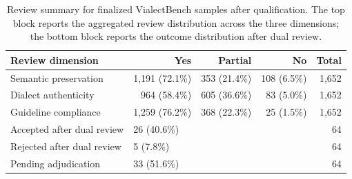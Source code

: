 \begin{table}[t]
\centering
\scriptsize
\setlength{\tabcolsep}{4pt}
\renewcommand{\arraystretch}{1.08}
\begin{tabular}{lrrrr}
\toprule
Review dimension & Yes & Partial & No & Total \\
\midrule
Semantic preservation & 1,191 (72.1\%) & 353 (21.4\%) & 108 (6.5\%) & 1,652 \\
Dialect authenticity & 964 (58.4\%) & 605 (36.6\%) & 83 (5.0\%) & 1,652 \\
Guideline compliance & 1,259 (76.2\%) & 368 (22.3\%) & 25 (1.5\%) & 1,652 \\
\midrule
Accepted after dual review & \multicolumn{3}{l}{26 (40.6\%)} & 64 \\
Rejected after dual review & \multicolumn{3}{l}{5 (7.8\%)} & 64 \\
Pending adjudication & \multicolumn{3}{l}{33 (51.6\%)} & 64 \\
\bottomrule
\end{tabular}
\caption{Review summary for finalized VialectBench samples after qualification. The top block reports the aggregated review distribution across the three dimensions; the bottom block reports the outcome distribution after dual review.}
\label{tab:review_summary_combined}
\end{table}
